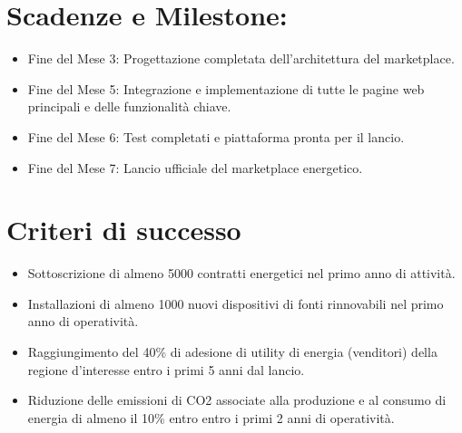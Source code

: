 \documentclass{report}
\begin{document}
\section*{Scadenze e Milestone:}
\begin{itemize}
    \item Fine del Mese 3: Progettazione completata dell'architettura del marketplace.
    \item Fine del Mese 5: Integrazione e implementazione di tutte le pagine web principali e delle funzionalità chiave.
    \item Fine del Mese 6: Test completati e piattaforma pronta per il lancio.
    \item Fine del Mese 7: Lancio ufficiale del marketplace energetico.
\end{itemize}


\section*{Criteri di successo}
\begin{itemize}
    \item Sottoscrizione di almeno 5000 contratti energetici nel primo anno di attività.
    \item Installazioni di almeno 1000 nuovi dispositivi di fonti rinnovabili nel primo anno di operatività.
    \item Raggiungimento del 40\% di adesione di utility di energia (venditori) della regione d'interesse entro i primi 5 anni dal lancio.
    \item Riduzione delle emissioni di CO2 associate alla produzione e al consumo di energia di almeno il 10\% entro  entro i primi 2 anni di operatività.
\end{itemize}
\end{document}
